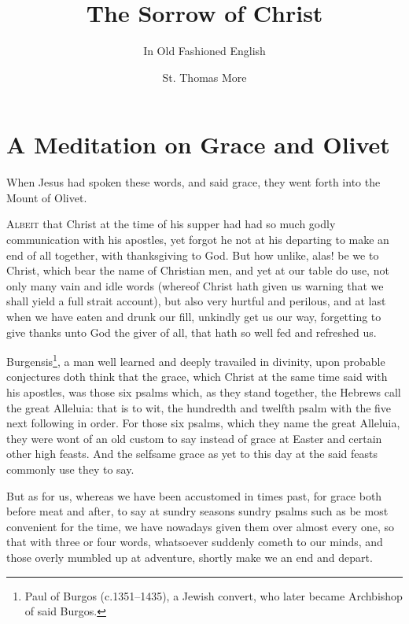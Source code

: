 \documentclass[a5paper]{scrbook}
\begin{document}
	\setmainfont{Times}
	\title{The Sorrow of Christ}
	\subtitle{In Old Fashioned English}
	\author{St. Thomas More}
	\frontmatter
	\maketitle
	\tableofcontents
	\mainmatter
	\chapter{A Meditation on Grace and Olivet}
	
	\begin{scripture}[Matthew 26:30]
		When Jesus had spoken these words, and said grace, they went forth into the
		Mount of Olivet.
	\end{scripture}
	
	\vspace{10mm}
	
	\lettrine{A}{lbeit} that Christ at the time of his supper had had so much godly communication with his apostles, yet forgot he not at his departing to make an end of all together, with thanksgiving to God. But how unlike, alas! be we to Christ, which bear the name of Christian men, and yet at our table do use, not only many vain and idle words (whereof Christ hath given us warning that we shall yield a full strait account), but also very hurtful and perilous, and at last when we have eaten and drunk our fill, unkindly get us our way, forgetting to give thanks unto God the giver of all, that hath so well fed and refreshed us.
	
	Burgensis\footnote{Paul of Burgos (c.1351–1435), a Jewish convert, who later became Archbishop of said Burgos.}, a man well learned and deeply travailed in divinity, upon probable conjectures doth think that the grace, which Christ at the same time said with his apostles, was those six psalms which, as they stand together, the Hebrews call the great Alleluia: that is to wit, the hundredth and twelfth psalm with the five next following in order. For those six psalms, which they name the great Alleluia, they were wont of an old custom to say instead of grace at Easter and certain other high feasts. And the selfsame grace as yet to this day at the said feasts commonly use they to say.
	
	But as for us, whereas we have been accustomed in times past, for grace both before meat and after, to say at sundry seasons sundry psalms such as be most convenient for the time, we have nowadays given them over almost every one, so that with three or four words, whatsoever suddenly cometh to our minds, and those overly mumbled up at adventure, shortly make we an end and depart.
	
\end{document}
